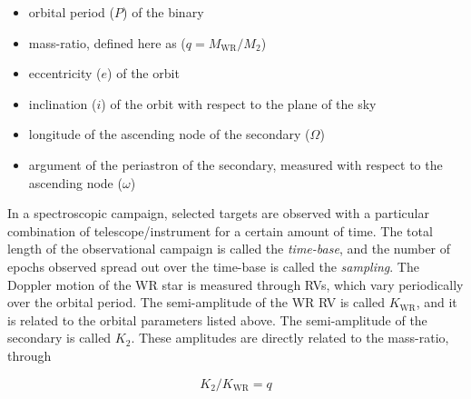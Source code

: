 \begin{itemize}
    \item orbital period ($P$) of the binary
    \item mass-ratio, defined here as ($q = M_{\textrm{WR}}/M_2$)
    \item eccentricity ($e$) of the orbit
    \item inclination ($i$) of the orbit with respect to the plane of the sky
    \item longitude of the ascending node of the secondary ($\Omega$)
    \item argument of the periastron of the secondary, measured with respect to the ascending node ($\omega$)
\end{itemize}

In a spectroscopic campaign, selected targets are observed with a particular combination of telescope/instrument for a certain amount of time. The total length of the observational campaign is called the \textit{time-base}, and the number of epochs observed spread out over the time-base is called the \textit{sampling}. The Doppler motion of the WR star is measured through RVs, which vary periodically over the orbital period. The semi-amplitude of the WR RV is called $K_{\textrm{WR}}$, and it is related to the orbital parameters listed above. The semi-amplitude of the secondary is called $K_2$. These amplitudes are directly related to the mass-ratio, through 

\begin{equation}
    K_2/K_{\textrm{WR}} = q 
\end{equation}

